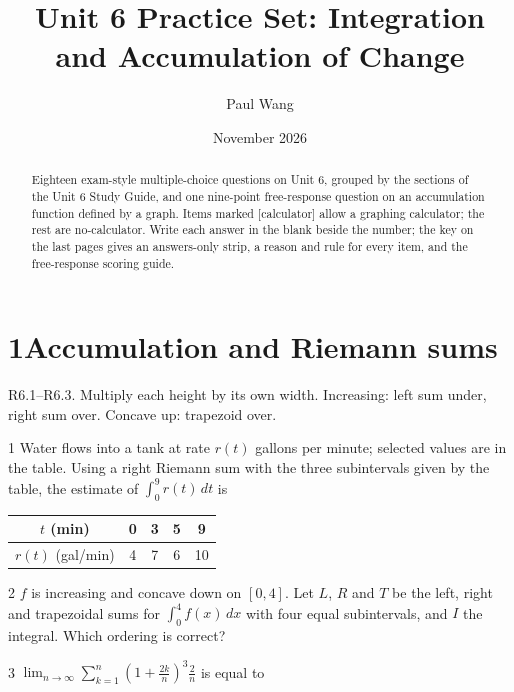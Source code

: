 \documentclass{apcalc}
\title{Unit 6 Practice Set: Integration and Accumulation of Change}
\author{Paul Wang}
\date{November 2026}
\begin{document}
\maketitle
\begin{abstract}
Eighteen exam-style multiple-choice questions on Unit 6, grouped by the sections of the Unit 6 Study Guide, and one nine-point free-response question on an accumulation function defined by a graph. Items marked [calculator] allow a graphing calculator; the rest are no-calculator. Write each answer in the blank beside the number; the key on the last pages gives an answers-only strip, a reason and rule for every item, and the free-response scoring guide.
\end{abstract}
\section*{1\quad Accumulation and Riemann sums}
\begin{setrule}R6.1–R6.3. Multiply each height by its own width. Increasing: left sum under, right sum over. Concave up: trapezoid over.\end{setrule}
\begin{q}{1}
Water flows into a tank at rate $r(t)$ gallons per minute; selected values are in the table. Using a right Riemann sum with the three subintervals given by the table, the estimate of $\int_0^9 r(t)\,dt$ is
\begin{center}\small\renewcommand{\arraystretch}{1.35}\begin{tabular}{|c|c|c|c|c|}
\hline
$t$ (min) & 0 & 3 & 5 & 9 \\ \hline
$r(t)$ (gal/min) & 4 & 7 & 6 & 10 \\ \hline
\end{tabular}\end{center}
\end{q}
\begin{q}{2}
$f$ is increasing and concave down on $[0,4]$. Let $L$, $R$ and $T$ be the left, right and trapezoidal sums for $\int_0^4 f(x)\,dx$ with four equal subintervals, and $I$ the integral. Which ordering is correct?
\end{q}
\begin{q}{3}
$\displaystyle\lim_{n\to\infty}\sum_{k=1}^{n}\left(1+\frac{2k}{n}\right)^3\frac{2}{n}$ is equal to
\end{q}
\end{document}
